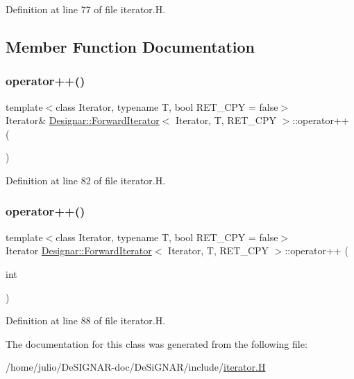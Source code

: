 Definition at line 77 of file iterator.\+H.



\subsection{Member Function Documentation}
\mbox{\label{class_designar_1_1_forward_iterator_a021a9305def76c968872089a778d2b41}} 
\subsubsection{\texorpdfstring{operator++()}{operator++()}\hspace{0.1cm}{\footnotesize\ttfamily [1/2]}}
{\footnotesize\ttfamily template$<$class Iterator, typename T, bool R\+E\+T\+\_\+\+C\+PY = false$>$ \\
Iterator\& \hyperlink{class_designar_1_1_forward_iterator}{Designar\+::\+Forward\+Iterator}$<$ Iterator, T, R\+E\+T\+\_\+\+C\+PY $>$\+::operator++ (\begin{DoxyParamCaption}{ }\end{DoxyParamCaption})\hspace{0.3cm}{\ttfamily [inline]}}



Definition at line 82 of file iterator.\+H.

\mbox{\label{class_designar_1_1_forward_iterator_a7182625f3375ba05868ae6f240628b1c}} 
\subsubsection{\texorpdfstring{operator++()}{operator++()}\hspace{0.1cm}{\footnotesize\ttfamily [2/2]}}
{\footnotesize\ttfamily template$<$class Iterator, typename T, bool R\+E\+T\+\_\+\+C\+PY = false$>$ \\
Iterator \hyperlink{class_designar_1_1_forward_iterator}{Designar\+::\+Forward\+Iterator}$<$ Iterator, T, R\+E\+T\+\_\+\+C\+PY $>$\+::operator++ (\begin{DoxyParamCaption}\item[{int}]{ }\end{DoxyParamCaption})\hspace{0.3cm}{\ttfamily [inline]}}



Definition at line 88 of file iterator.\+H.



The documentation for this class was generated from the following file\+:\begin{DoxyCompactItemize}
\item 
/home/julio/\+De\+S\+I\+G\+N\+A\+R-\/doc/\+De\+Si\+G\+N\+A\+R/include/\hyperlink{iterator_8_h}{iterator.\+H}\end{DoxyCompactItemize}
